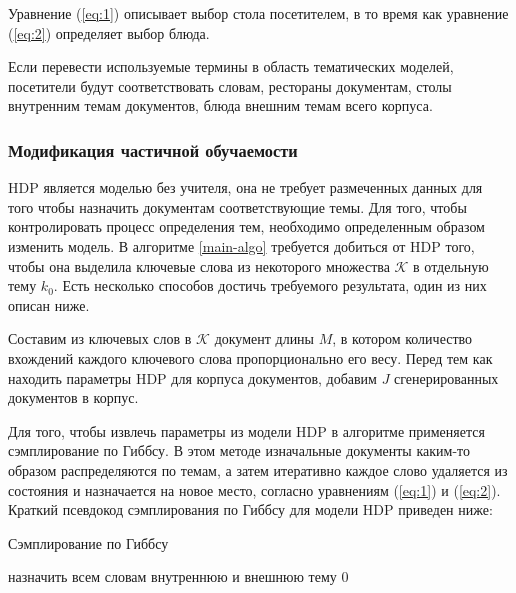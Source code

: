 \documentclass[12pt, a4paper]{article}
\begin{document}
  Уравнение (\ref{eq:1}) описывает выбор стола посетителем, в то время как уравнение (\ref{eq:2}) определяет выбор блюда.
  
  Если перевести используемые термины в область тематических моделей, посетители будут соответствовать словам, рестораны документам, столы внутренним темам документов, блюда внешним темам всего корпуса\cite{hdp-1}.
  
  \subsubsection{Модификация частичной обучаемости}
  HDP является моделью без учителя, она не требует размеченных данных для того чтобы назначить документам соответствующие темы. Для того, чтобы контролировать процесс определения тем, необходимо определенным образом изменить модель. В алгоритме \ref{main-algo} требуется добиться от HDP того, чтобы она выделила ключевые слова из некоторого множества $\mathcal{K}$ в отдельную тему $k_0$. Есть несколько способов достичь требуемого результата, один из них описан ниже.
  
	Составим из ключевых слов в $\mathcal{K}$ документ длины $M$, в котором количество вхождений каждого ключевого слова пропорционально его весу. Перед тем как находить параметры HDP для корпуса документов, добавим $J$ сгенерированных документов в корпус\cite{ss-learning}. 
	
  Для того, чтобы извлечь параметры из модели HDP в алгоритме применяется сэмплирование по Гиббсу. В этом методе изначальные документы каким-то образом распределяются по темам, а затем итеративно каждое слово удаляется из состояния и назначается на новое место, согласно уравнениям (\ref{eq:1}) и (\ref{eq:2}). Краткий псевдокод сэмплирования по Гиббсу для модели HDP приведен ниже:
  
  \begin{algorithm}[H]
  	\caption{Сэмплирование по Гиббсу}
    \SetAlgoLined
  	назначить всем словам внутреннюю и внешнюю тему $0$\;
  \end{algorithm}
  
\end{document}

